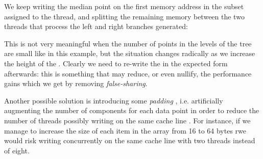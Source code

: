 \documentclass{article}
\begin{document}
We keep writing the median point on the first memory address in the subset
assigned to the thread, and splitting the remaining memory between the two
threads that process the left and right branches generated:
\begin{figure}[H]
    \centering
\end{figure}

This is not very meaningful when the number of points in the levels of the tree
are small like in this example, but the situation changes radically as we
increase the height of the \kdtree{}. Clearly we need to re-write the \kdtree{}
in the expected form afterwards: this is something that may reduce, or even
nullify, the performance gains which we get by removing \emph{false-sharing}.

Another possible solution is introducing some \emph{padding}
\cite{hager2010introduction}, i.e. artificially augmenting the number of
components for each data point in order to reduce the number of threads possibly
writing on the same cache line . For instance, if we manage to increase the size
of each item in the array from 16 to 64 bytes rwe would risk writing
concurrently on the same cache line with two threads instead of eight.
\end{document}
